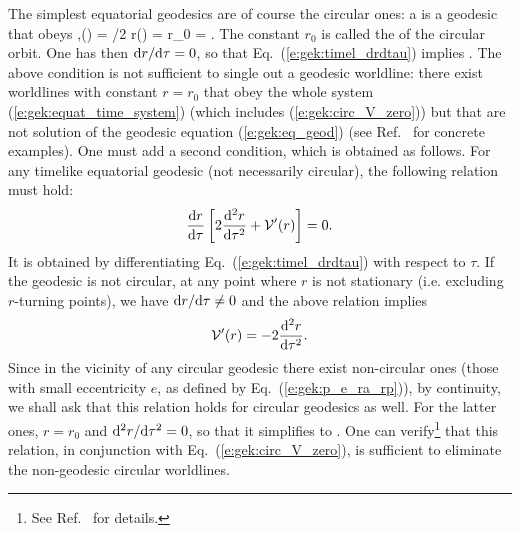 The simplest equatorial geodesics are of course the circular ones:
a 
is a geodesic that obeys
\be \label{e:gek:def_circular_orbit}
    \forall\tau\in{},\quad \theta(\tau) = \pi/2 \qand r(\tau) = r_0 =  .
\ee
The constant $r_0$ is called the  of the circular
orbit.
One has then $\mathrm{d} r/\mathrm{d}\tau = 0$, so that Eq.~(\ref{e:gek:timel_drdtau}) implies
\be \label{e:gek:circ_V_zero}
    .
\ee
The above condition is not sufficient to single out a geodesic worldline:
there exist worldlines with constant $r=r_0$ that obey the whole system
(\ref{e:gek:equat_time_system}) (which includes (\ref{e:gek:circ_V_zero}))
but that are not solution of the
geodesic equation (\ref{e:gek:eq_geod})
(see Ref.~\cite{Vanae20} for concrete examples). One must add a second condition, which
is obtained as follows. For any timelike equatorial geodesic (not necessarily
circular), the following relation must hold:
\[
    \frac{\mathrm{d} r}{\mathrm{d} \tau} \left[ 2 \frac{\mathrm{d}^2 r}{\mathrm{d} {\tau}^2} + \mathcal{V}'(r) \right] = 0 .
\]
It is obtained by differentiating Eq.~(\ref{e:gek:timel_drdtau}) with respect
to $\tau$. If the geodesic is not circular, at any point where $r$ is not
stationary (i.e. excluding $r$-turning points), we have $\mathrm{d} r/\mathrm{d}\tau \neq 0$
and the above relation implies
\[
    \mathcal{V}'(r) = - 2 \frac{\mathrm{d}^2 r}{\mathrm{d} {\tau}^2} .
\]
Since in the vicinity of any circular geodesic there exist non-circular ones
(those with small eccentricity $e$, as defined by Eq.~(\ref{e:gek:p_e_ra_rp})), by continuity, we shall ask that this relation
holds for circular geodesics as well. For the latter ones, $r=r_0$ and
$\mathrm{d}^2 r/\mathrm{d}\tau^2 = 0$, so that it simplifies to
\be \label{e:gek:circ_derV_zero}
    .
\ee
One can verify\footnote{See Ref.~\cite{Vanae20} for details.} that this
relation, in conjunction with Eq.~(\ref{e:gek:circ_V_zero}), is sufficient
to eliminate the non-geodesic circular worldlines.

